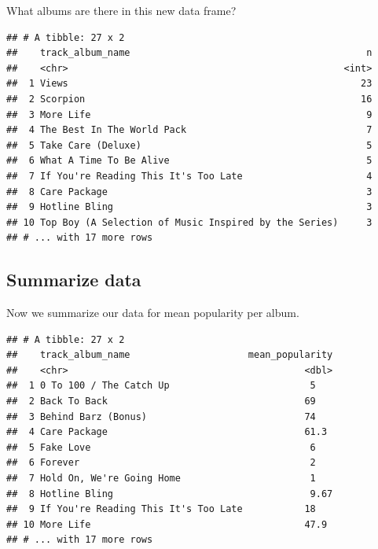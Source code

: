 \documentclass[
]{book}
\newenvironment{Shaded}{\begin{snugshade}}{\end{snugshade}}
\newcommand{\DataTypeTok}[1]{\textcolor[rgb]{0.13,0.29,0.53}{#1}}
\newcommand{\KeywordTok}[1]{\textcolor[rgb]{0.13,0.29,0.53}{\textbf{#1}}}
\newcommand{\NormalTok}[1]{#1}
\newcommand{\OperatorTok}[1]{\textcolor[rgb]{0.81,0.36,0.00}{\textbf{#1}}}
\newcommand{\StringTok}[1]{\textcolor[rgb]{0.31,0.60,0.02}{#1}}
\begin{document}
What albums are there in this new data frame?

\begin{Shaded}
\end{Shaded}

\begin{verbatim}
## # A tibble: 27 x 2
##    track_album_name                                          n
##    <chr>                                                 <int>
##  1 Views                                                    23
##  2 Scorpion                                                 16
##  3 More Life                                                 9
##  4 The Best In The World Pack                                7
##  5 Take Care (Deluxe)                                        5
##  6 What A Time To Be Alive                                   5
##  7 If You're Reading This It's Too Late                      4
##  8 Care Package                                              3
##  9 Hotline Bling                                             3
## 10 Top Boy (A Selection of Music Inspired by the Series)     3
## # ... with 17 more rows
\end{verbatim}

\hypertarget{summarize-data}{%
\subsection{Summarize data}\label{summarize-data}}

Now we summarize our data for mean popularity per album.

\begin{Shaded}
\end{Shaded}

\begin{verbatim}
## # A tibble: 27 x 2
##    track_album_name                     mean_popularity
##    <chr>                                          <dbl>
##  1 0 To 100 / The Catch Up                         5   
##  2 Back To Back                                   69   
##  3 Behind Barz (Bonus)                            74   
##  4 Care Package                                   61.3 
##  5 Fake Love                                       6   
##  6 Forever                                         2   
##  7 Hold On, We're Going Home                       1   
##  8 Hotline Bling                                   9.67
##  9 If You're Reading This It's Too Late           18   
## 10 More Life                                      47.9 
## # ... with 17 more rows
\end{verbatim}
\end{document}
